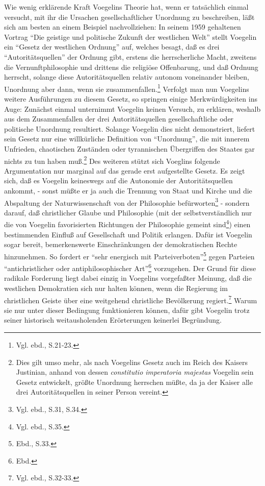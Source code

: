 Wie wenig erklärende Kraft Voegelins Theorie hat, wenn er tatsächlich einmal
versucht, mit ihr die Ursachen gesellschaftlicher Unordnung zu beschreiben,
läßt sich am besten an einem Beispiel nachvollziehen: In seinem 1959
gehaltenen Vortrag "`Die geistige und politische Zukunft der westlichen Welt"'
stellt Voegelin ein "`Gesetz der westlichen Ordnung"' auf, welches besagt, daß
es drei "`Autoritätsquellen"' der Ordnung gibt, erstens die herrscherliche
Macht, zweitens die Vernunftphilosophie und drittens die religiöse
Offenbarung, und daß Ordnung herrscht, solange diese Autoritätsquellen relativ
autonom voneinander bleiben, Unordnung aber dann, wenn sie
zusammenfallen.\footnote{Vgl. ebd., S.21-23.} Verfolgt man nun Voegelins
weitere Ausführungen zu diesem Gesetz, so springen einige Merkwürdigkeiten ins
Auge: Zunächst einmal unternimmt Voegelin keinen Versuch, zu erklären, weshalb
aus dem Zusammenfallen der drei Autoritätsquellen gesellschaftliche oder
politische Unordnung resultiert. Solange Voegelin dies
nicht demonstriert, liefert sein Gesetz nur eine willkürliche Definition von
"`Unordnung"', die mit innerem Unfrieden, chaotischen Zuständen oder
tyrannischen Übergriffen des Staates gar nichts zu tun haben
muß.\footnote{Dies gilt umso mehr, als nach Voegelins Gesetz auch im Reich des
  Kaisers Justinian, anhand von dessen {\it constitutio imperatoria majestas}
  Voegelin sein Gesetz entwickelt, größte Unordnung herrschen müßte, da ja der
  Kaiser alle drei Autoritätsquellen in seiner Person vereint.} Des weiteren
stützt sich Voeglins folgende Argumentation nur marginal auf das gerade erst
aufgestellte Gesetz. Es zeigt sich, daß es Voegelin keineswegs auf die
Autonomie der Autoritätsquellen ankommt, - sonst müßte er ja auch die Trennung
von Staat und Kirche und die Abspaltung der Naturwissenschaft von der
Philosophie befürworten\footnote{Vgl. ebd., S.31, S.34.} - sondern darauf, daß
christlicher Glaube und Philosophie (mit der selbstverständlich nur die von
Voegelin favorisierten Richtungen der Philosophie gemeint sind\footnote{Vgl.
  ebd., S.35.}) einen bestimmenden Einfluß auf Gesellschaft und Politik
erlangen. Dafür ist Voegelin sogar bereit, bemerkenswerte Einschränkungen der
demokratischen Rechte hinzunehmen. So fordert er "`sehr energisch mit
Parteiverboten"'\footnote{Ebd., S.33.} gegen Parteien "`antichristlicher oder
antiphilosophischer Art"'\footnote{Ebd.} vorzugehen. Der Grund für diese
radikale Forderung liegt dabei einzig in Voegelins vorgefaßter Meinung, daß
die westlichen Demokratien sich nur halten können, wenn die Regierung im
christlichen Geiste über eine weitgehend christliche Bevölkerung
regiert.\footnote{Vgl. ebd., S.32-33.} Warum sie nur unter dieser Bedingung
funktionieren können, dafür gibt Voegelin trotz seiner historisch
weitausholenden Erörterungen keinerlei Begründung.

